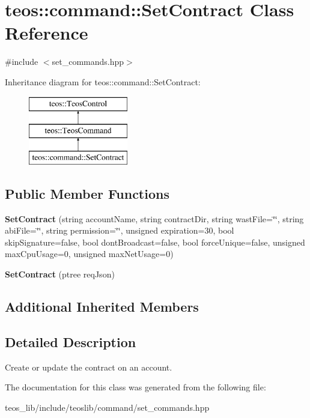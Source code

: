 \hypertarget{classteos_1_1command_1_1_set_contract}{}\section{teos\+:\+:command\+:\+:Set\+Contract Class Reference}
\label{classteos_1_1command_1_1_set_contract}


{\ttfamily \#include $<$set\+\_\+commands.\+hpp$>$}

Inheritance diagram for teos\+:\+:command\+:\+:Set\+Contract\+:\begin{figure}[H]
\begin{center}
\leavevmode
\includegraphics[height=3.000000cm]{classteos_1_1command_1_1_set_contract}
\end{center}
\end{figure}
\subsection*{Public Member Functions}
\begin{DoxyCompactItemize}
\item 
\mbox{\label{classteos_1_1command_1_1_set_contract_a1a851280aa0011a523640ea79221d095}} 
{\bfseries Set\+Contract} (string account\+Name, string contract\+Dir, string wast\+File=\char`\"{}\char`\"{}, string abi\+File=\char`\"{}\char`\"{}, string permission=\char`\"{}\char`\"{}, unsigned expiration=30, bool skip\+Signature=false, bool dont\+Broadcast=false, bool force\+Unique=false, unsigned max\+Cpu\+Usage=0, unsigned max\+Net\+Usage=0)
\item 
\mbox{\label{classteos_1_1command_1_1_set_contract_ad964aae40c3062bbb1a40fad503df852}} 
{\bfseries Set\+Contract} (ptree req\+Json)
\end{DoxyCompactItemize}
\subsection*{Additional Inherited Members}


\subsection{Detailed Description}
Create or update the contract on an account. 

The documentation for this class was generated from the following file\+:\begin{DoxyCompactItemize}
\item 
teos\+\_\+lib/include/teoslib/command/set\+\_\+commands.\+hpp\end{DoxyCompactItemize}
